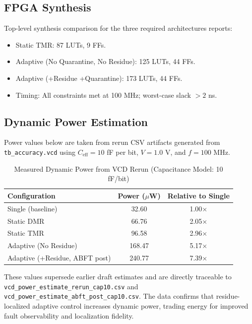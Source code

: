 \documentclass[conference]{IEEEtran}
\begin{document}
\subsection{FPGA Synthesis}

Top-level synthesis comparison for the three required architectures reports:
\begin{itemize}
  \item Static TMR: 87 LUTs, 9 FFs.
  \item Adaptive (No Quarantine, No Residue): 125 LUTs, 44 FFs.
  \item Adaptive (+Residue +Quarantine): 173 LUTs, 44 FFs.
  \item Timing: All constraints met at 100 MHz; worst-case slack $> 2$ ns.
\end{itemize}

\subsection{Dynamic Power Estimation}

Power values below are taken from rerun CSV artifacts generated from \texttt{tb\_accuracy.vcd}
using $C_{\text{eff}} = 10$ fF per bit, $V = 1.0$ V, and $f = 100$ MHz.

\begin{table}[htbp]
\centering
\caption{Measured Dynamic Power from VCD Rerun (Capacitance Model: 10 fF/bit)}
\label{tab:power}
\begin{tabular}{|l|c|c|}
\hline
\textbf{Configuration} & \textbf{Power ($\mu$W)} & \textbf{Relative to Single} \\
\hline
Single (baseline)              & 32.60  & 1.00$\times$ \\
Static DMR                     & 66.76  & 2.05$\times$ \\
Static TMR                     & 96.58  & 2.96$\times$ \\
Adaptive (No Residue)          & 168.47 & 5.17$\times$ \\
Adaptive (+Residue, ABFT post) & 240.77 & 7.39$\times$ \\
\hline
\end{tabular}
\end{table}

These values supersede earlier draft estimates and are directly traceable to
\texttt{vcd\_power\_estimate\_rerun\_cap10.csv} and \texttt{vcd\_power\_estimate\_abft\_post\_cap10.csv}.
The data confirms that residue-localized adaptive control increases dynamic power, trading energy for improved fault observability and localization fidelity.
\end{document}
